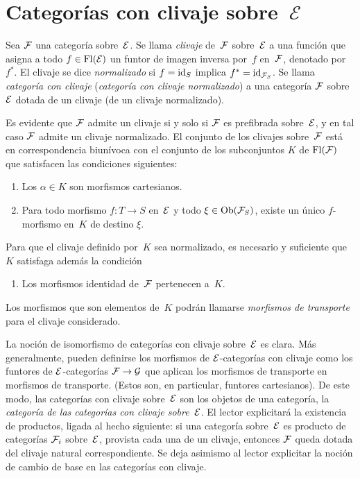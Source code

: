 \section{Categorías con clivaje sobre~$\mathcal{E}$}
\label{VI.7}

\begin{definition}
\label{VI.7.1} Sea $\cal{F}$ una categoría sobre~$\cal{E}$. Se llama
\emph{clivaje}
%
de~$\cal{F}$ sobre~$\cal{E}$ a una función que asigna a todo
$f\in\Fl(\cal{E})$ un funtor de imagen inversa por~$f$ en~$\cal{F}$,
denotado por~$f^*$. El clivaje se dice \emph{normalizado}
%
%
si $f=\id_S$ implica $f^*=\id_{\cal{F}_S}$. Se llama
\emph{categoría con clivaje} (\resp \emph{categoría con clivaje
normalizado})
%
a una categoría $\cal{F}$ sobre~$\cal{E}$ dotada de un clivaje
(\resp de un clivaje normalizado).
\end{definition}

Es evidente que $\cal{F}$ admite un clivaje si y solo si $\cal{F}$ es
prefibrada sobre~$\cal{E}$, y en tal caso $\cal{F}$ admite un clivaje
normalizado. El conjunto de los clivajes sobre~$\cal{F}$ está en
correspondencia biunívoca con el conjunto de los subconjuntos $K$ de
$\Fl(\cal{F})$ que satisfacen las condiciones siguientes:
\begin{enumerate}
\item[a)] Los $\alpha\in K$ son morfismos cartesianos.
\item[b)] Para todo morfismo $f\colon T\to S$ en~$\cal{E}$ y todo
$\xi\in\Ob(\cal{F}_S)$, existe un único $f$-morfismo en~$K$ de destino
$\xi$.
\end{enumerate}

Para que el clivaje definido por~$K$ sea normalizado, es necesario y
suficiente que $K$ satisfaga además la condición
\begin{enumerate}
\item[c)] Los morfismos identidad de~$\cal{F}$ pertenecen a~$K$.
\end{enumerate}

Los
morfismos que son elementos de~$K$ podrán llamarse
\emph{\og morfismos de transporte\fg}
%
para el clivaje considerado.

La noción de isomorfismo de categorías con clivaje sobre~$\cal{E}$ es
clara. Más generalmente, pueden definirse los morfismos de
$\cal{E}$-categorías con clivaje como los funtores de
$\cal{E}$-categorías $\cal{F}\to\cal{G}$ que aplican los morfismos de
transporte en morfismos de transporte.
(Estos son, en particular, funtores cartesianos). De este modo, las
categorías con clivaje sobre~$\cal{E}$ son los objetos de una categoría,
la \emph{categoría de las categorías con clivaje sobre}~$\cal{E}$. El
lector explicitará la existencia de productos, ligada al hecho siguiente:
si una categoría sobre~$\cal{E}$ es producto de categorías $\cal{F}_i$
sobre~$\cal{E}$, provista cada una de un clivaje, entonces $\cal{F}$ queda
dotada del clivaje natural correspondiente. Se deja asimismo al lector
explicitar la noción de cambio de base en las categorías con clivaje.

